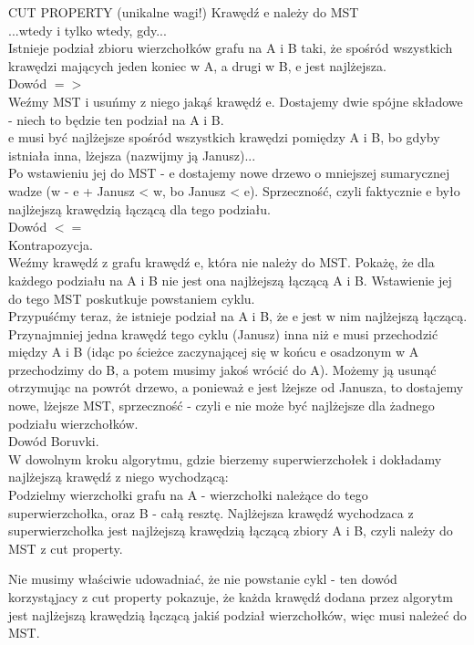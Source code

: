 \documentclass[a4paper]{article}
\begin{document}
CUT PROPERTY (unikalne wagi!)
Krawędź e należy do MST\\
...wtedy i tylko wtedy, gdy...\\
Istnieje podział zbioru wierzchołków grafu na A i B taki, że spośród wszystkich krawędzi mających jeden koniec w A, a drugi w B, e jest najlżejsza.\\

Dowód $=>$\\
Weźmy MST i usuńmy z niego jakąś krawędź e. Dostajemy dwie spójne składowe - niech to będzie ten podział na A i B.\\
e musi być najlżejsze spośród wszystkich krawędzi pomiędzy A i B, bo gdyby istniała inna, lżejsza (nazwijmy ją Janusz)...\\
Po wstawieniu jej do MST - {e} dostajemy nowe drzewo o mniejszej sumarycznej wadze (w - e + Janusz < w, bo Janusz < e). Sprzeczność, czyli faktycznie e było najlżejszą krawędzią łączącą dla tego podziału.\\

Dowód $<=$\\
Kontrapozycja.\\
Weźmy krawędź z grafu krawędź e, która nie należy do MST. Pokażę, że dla każdego podziału na A i B nie jest ona najlżejszą łączącą A i B.
Wstawienie jej do tego MST poskutkuje powstaniem cyklu.\\
Przypuśćmy teraz, że istnieje podział na A i B, że e jest w nim najlżejszą łączącą. Przynajmniej jedna krawędź tego cyklu (Janusz) inna niż e musi przechodzić między A i B (idąc po ścieżce zaczynającej się w końcu e osadzonym w A przechodzimy do B, a potem musimy jakoś wrócić do A). Możemy ją usunąć otrzymując na powrót drzewo, a ponieważ e jest lżejsze od Janusza, to dostajemy nowe, lżejsze MST, sprzeczność - czyli e nie może być najlżejsze dla żadnego podziału wierzchołków.\\

Dowód Boruvki.\\
W dowolnym kroku algorytmu, gdzie bierzemy superwierzchołek i dokładamy najlżejszą krawędź z niego wychodzącą:\\
Podzielmy wierzchołki grafu na A - wierzchołki należące do tego superwierzchołka, oraz B - całą resztę. Najlżejsza krawędź wychodzaca z superwierzchołka jest najlżejszą krawędzią łączącą zbiory A i B, czyli należy do MST z cut property.

Nie musimy właściwie udowadniać, że nie powstanie cykl - ten dowód korzystąjacy z cut property pokazuje, że każda krawędź dodana przez algorytm jest najlżejszą krawędzią łączącą jakiś podział wierzchołków, więc musi należeć do MST.
\fi
\end{document}

